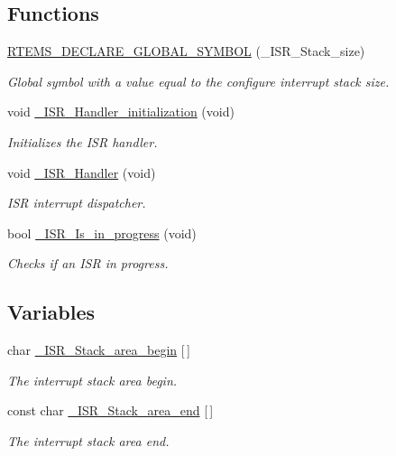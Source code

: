 \subsection*{Functions}
\begin{DoxyCompactItemize}
\item 
\mbox{\hyperlink{group__RTEMSScoreISR_gab90dca799ff51b1e1901a42d45e1f7cc}{R\+T\+E\+M\+S\+\_\+\+D\+E\+C\+L\+A\+R\+E\+\_\+\+G\+L\+O\+B\+A\+L\+\_\+\+S\+Y\+M\+B\+OL}} (\+\_\+\+I\+S\+R\+\_\+\+Stack\+\_\+size)
\begin{DoxyCompactList}\small\item\em Global symbol with a value equal to the configure interrupt stack size. \end{DoxyCompactList}\item 
void \mbox{\hyperlink{group__RTEMSScoreISR_ga8be8e02047ef8c71112a4abd6fa441b7}{\+\_\+\+I\+S\+R\+\_\+\+Handler\+\_\+initialization}} (void)
\begin{DoxyCompactList}\small\item\em Initializes the I\+SR handler. \end{DoxyCompactList}\item 
void \mbox{\hyperlink{group__RTEMSScoreISR_ga559fbd0c5a6dca57b0fe7a061fe96b3f}{\+\_\+\+I\+S\+R\+\_\+\+Handler}} (void)
\begin{DoxyCompactList}\small\item\em I\+SR interrupt dispatcher. \end{DoxyCompactList}\item 
bool \mbox{\hyperlink{group__RTEMSScoreISR_ga3b125bb9faac2fa94bd0ba0583cf5f77}{\+\_\+\+I\+S\+R\+\_\+\+Is\+\_\+in\+\_\+progress}} (void)
\begin{DoxyCompactList}\small\item\em Checks if an I\+SR in progress. \end{DoxyCompactList}\end{DoxyCompactItemize}
\subsection*{Variables}
\begin{DoxyCompactItemize}
\item 
char \mbox{\hyperlink{group__RTEMSScoreISR_gaa99477ab97d23ea19a5fe92203fc4cd5}{\+\_\+\+I\+S\+R\+\_\+\+Stack\+\_\+area\+\_\+begin}} \mbox{[}$\,$\mbox{]}
\begin{DoxyCompactList}\small\item\em The interrupt stack area begin. \end{DoxyCompactList}\item 
const char \mbox{\hyperlink{group__RTEMSScoreISR_ga86f97480eba58b44ee331ad49daa54e2}{\+\_\+\+I\+S\+R\+\_\+\+Stack\+\_\+area\+\_\+end}} \mbox{[}$\,$\mbox{]}
\begin{DoxyCompactList}\small\item\em The interrupt stack area end. \end{DoxyCompactList}\end{DoxyCompactItemize}


